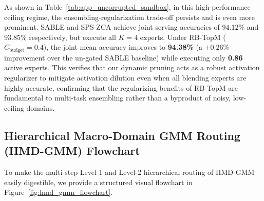 \documentclass{article}
\theoremstyle{plain}
\theoremstyle{definition}
\theoremstyle{remark}
\begin{document}
As shown in Table~\ref{tab:app_uncorrupted_sandbox}, in this high-performance ceiling regime, the ensembling-regularization trade-off persists and is even more prominent. SABLE and SPS-ZCA achieve joint serving accuracies of $94.12\%$ and $93.85\%$ respectively, but execute all $K=4$ experts. Under RB-TopM ($C_{\text{budget}} = 0.4$), the joint mean accuracy improves to \textbf{94.38\%} (a $+0.26\%$ improvement over the un-gated SABLE baseline) while executing only \textbf{0.86} active experts. This verifies that our dynamic pruning acts as a robust activation regularizer to mitigate activation dilution even when all blending experts are highly accurate, confirming that the regularizing benefits of RB-TopM are fundamental to multi-task ensembling rather than a byproduct of noisy, low-ceiling domains.

\subsection{Hierarchical Macro-Domain GMM Routing (HMD-GMM) Flowchart}
To make the multi-step Level-1 and Level-2 hierarchical routing of HMD-GMM easily digestible, we provide a structured visual flowchart in Figure~\ref{fig:hmd_gmm_flowchart}.
\end{document}
